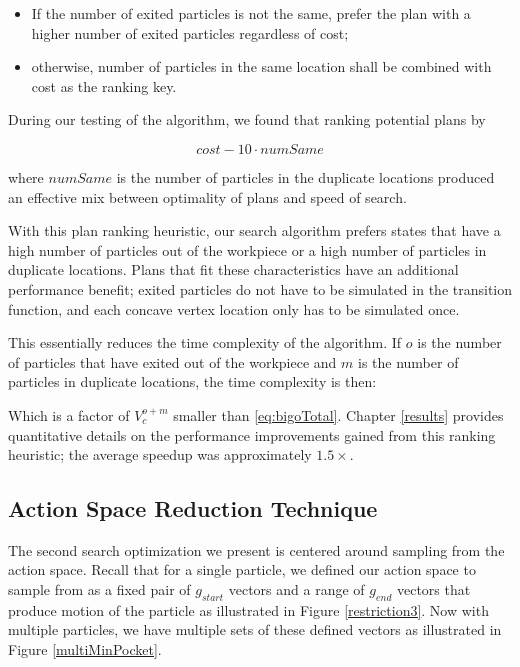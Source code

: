 \begin{itemize}
\item If the number of exited particles is not the same, prefer the plan with a higher number of exited particles regardless of cost;
\item otherwise, number of particles in the same location shall be combined with cost as the ranking key.
\end{itemize}

During our testing of the algorithm, we found that ranking potential plans by

$$
cost - 10 \cdot numSame
$$

where $numSame$ is the number of particles in the duplicate locations produced an effective mix between optimality of plans and speed of search.

With this plan ranking heuristic, our search algorithm prefers states that have a high number of particles out of the workpiece or a high number of particles in duplicate locations. Plans that fit these characteristics have an additional performance benefit; exited particles do not have to be simulated in the transition function, and each concave vertex location only has to be simulated once.

This essentially reduces the time complexity of the algorithm. If $o$ is the number of particles that have exited out of the workpiece and $m$ is the number of particles in duplicate locations, the time complexity is then:

 {
  \label{eq:bigoTotalWithHeuristic}
}

Which is a factor of $V_{c}^{o + m}$ smaller than \eqref{eq:bigoTotal}. Chapter \ref{results} provides quantitative details on the performance improvements gained from this ranking heuristic; the average speedup was approximately $1.5 \times$.

\subsection{Action Space Reduction Technique}

The second search optimization we present is centered around sampling from the action space. Recall that for a single particle, we defined our action space to sample from as a fixed pair of $g_{start}$ vectors and a range of $g_{end}$ vectors that produce motion of the particle as illustrated in Figure \ref{restriction3}. Now with multiple particles, we have multiple sets of these defined vectors as illustrated in Figure \ref{multiMinPocket}.

